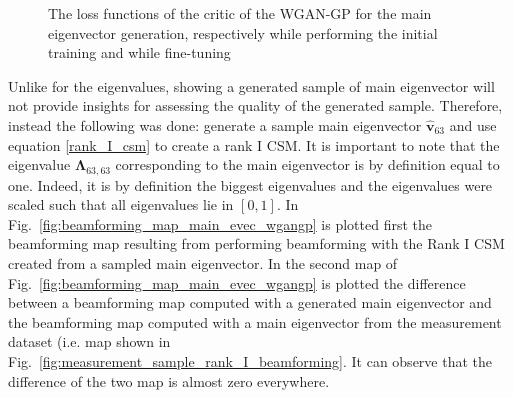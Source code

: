 \documentclass[11pt,a4paper,twoside]{report}
\begin{document}
\begin{figure}
    \centering
    \caption{The loss functions of the critic of the WGAN-GP for the main eigenvector generation, respectively while performing the initial training and while fine-tuning}
    \label{fig:loss_main_evec_wgangp}
\end{figure}

Unlike for the eigenvalues, showing a generated sample of main eigenvector will not provide insights for assessing the quality of the generated sample. Therefore, instead the following was done: generate a sample main eigenvector $\hat{\mathbf{v}}_{63}$ and use equation \ref{rank_I_csm} to create a rank I CSM. It is important to note that the eigenvalue $\mathbf{\Lambda}_{63, 63}$ corresponding to the main eigenvector is by definition equal to one. Indeed, it is by definition the biggest eigenvalues and the eigenvalues were scaled such that all eigenvalues lie in $[0,1]$.  In Fig.~\ref{fig:beamforming_map_main_evec_wgangp} is plotted first the beamforming map resulting from performing beamforming with the Rank I CSM created from a sampled main eigenvector. In the second map of Fig.~\ref{fig:beamforming_map_main_evec_wgangp} is plotted the difference between a beamforming map computed with a generated main eigenvector and the beamforming map computed with a main eigenvector from the measurement dataset (i.e. map shown in Fig.~\ref{fig:measurement_sample_rank_I_beamforming}. It can observe that the difference of the two map is almost zero everywhere.
\end{document}

